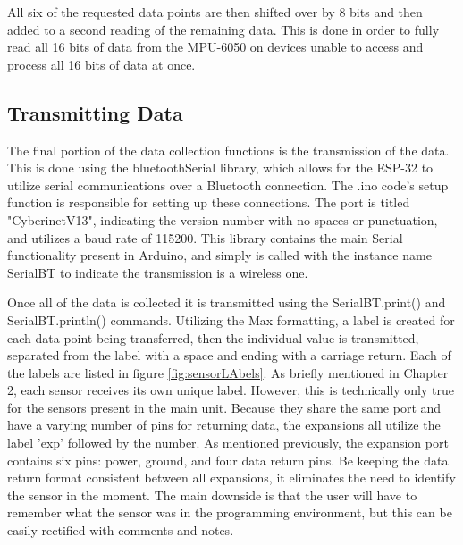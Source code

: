 All six of the requested data points are then shifted over by 8 bits and then added to a second reading of the remaining data. This is done in order to fully read all 16 bits of data from the MPU-6050 on devices unable to access and process all 16 bits of data at once. 


\subsection{Transmitting Data}
The final portion of the data collection functions is the transmission of the data. This is done using the bluetoothSerial library, which allows for the ESP-32 to utilize serial communications over a Bluetooth connection. The .ino code's setup function is responsible for setting up these connections. The port is titled "CyberinetV13", indicating the version number with no spaces or punctuation, and utilizes a baud rate of 115200. This library contains the main Serial functionality present in Arduino, and simply is called with the instance name SerialBT to indicate the transmission is a wireless one.

Once all of the data is collected it is transmitted using the SerialBT.print() and SerialBT.println() commands. Utilizing the Max formatting, a label is created for each data point being transferred, then the individual value is transmitted, separated from the label with a space and ending with a carriage return. Each of the labels are listed in figure \ref{fig:sensorLAbels}. As briefly mentioned in Chapter 2, each sensor receives its own unique label. However, this is technically only true for the sensors present in the main unit. Because they share the same port and have a varying number of pins for returning data, the expansions all utilize the label 'exp' followed by the number. As mentioned previously, the expansion port contains six pins: power, ground, and four data return pins. Be keeping the data return format consistent between all expansions, it eliminates the need to identify the sensor in the moment. The main downside is that the user will have to remember what the sensor was in the programming environment, but this can be easily rectified with comments and notes.


